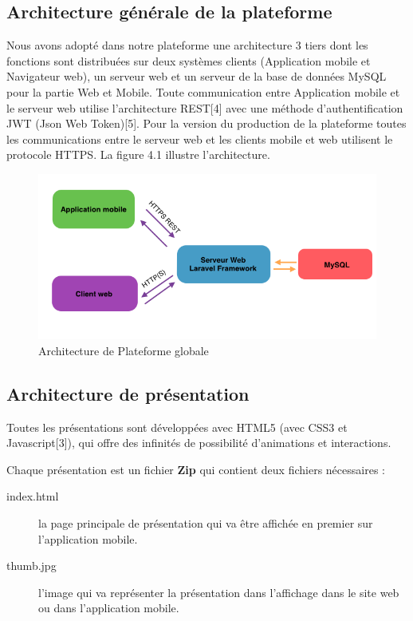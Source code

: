 \documentclass[12pt, ChapStyle1, oneside]{./Styles/Dea_Gsm}
\begin{document}
\subsection{Architecture générale de la plateforme}
Nous avons adopté dans notre plateforme une architecture 3 tiers dont les fonctions sont distribuées sur deux systèmes clients (Application mobile et Navigateur web), un serveur web et un serveur de la base de données MySQL pour la partie Web et Mobile.
Toute communication entre Application mobile et le serveur web utilise l'architecture REST[4] avec une méthode d'authentification JWT (Json Web Token)[5].
Pour la version du production de la plateforme toutes les communications entre le serveur web et les clients mobile et web utilisent le protocole HTTPS.
La figure 4.1 illustre l'architecture.
\begin{figure}[H]
    \centering
    \includegraphics[width=5.0in]{archi}
    \caption{Architecture de Plateforme globale}
    \label{diagdeploit}
\end{figure}

\subsection{Architecture de présentation}
Toutes les présentations sont développées avec HTML5 (avec CSS3 et Javascript[3]), qui offre des infinités de possibilité d'animations et interactions.

Chaque présentation est un fichier \textbf{Zip} qui contient deux fichiers nécessaires :
\begin{description}
\item[index.html] la page principale de présentation qui va être affichée en premier sur l'application mobile.
\item[thumb.jpg] l'image qui va représenter la présentation dans l'affichage dans le site web ou dans l'application mobile.
\end{description}
\end{document}
